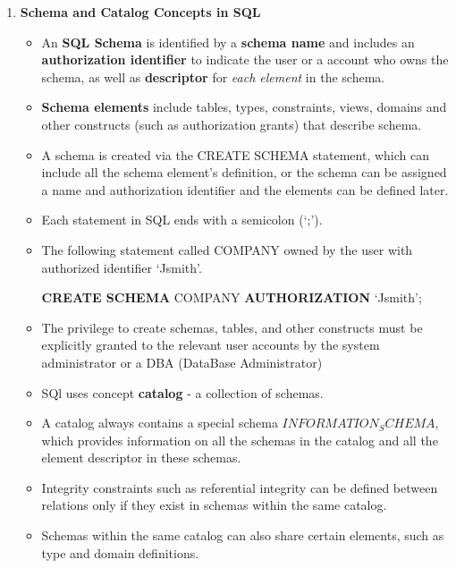 \documentclass[10pt]{article}
\begin{document}
\begin{enumerate}
	\item \textbf{Schema and Catalog Concepts in SQL}
	\begin{itemize}
		\item An \textbf{SQL Schema} is identified by a \textbf{schema name} and includes an \textbf{authorization identifier} to indicate the user or a account who owns the schema, as well as \textbf{descriptor} for \textit{each element} in the schema.
		\item \textbf{Schema elements} include tables, types, constraints, views, domains and other constructs (such as authorization grants) that describe schema.
		\item A schema is created via the CREATE SCHEMA statement, which can include all the schema element's definition, or the schema can be assigned a name and authorization identifier and the elements can be defined later.
		\item Each statement in SQL ends with a semicolon (`;').
		\item The following statement called COMPANY owned by the user with authorized identifier `Jsmith'.
		\begin{center}
			\textbf{CREATE SCHEMA} COMPANY \textbf{AUTHORIZATION} `Jsmith';
		\end{center}
		\item The privilege to create schemas, tables, and other constructs must be explicitly granted to the relevant user accounts by the system administrator or a DBA (DataBase Administrator)
		\item SQl uses concept \textbf{catalog} - a collection of schemas.
		\item A catalog always contains a special schema $INFORMATION_SCHEMA$, which provides information on all the schemas in the catalog and all the element descriptor in these schemas.
		\item Integrity constraints such as referential integrity can be defined between relations only if they exist in schemas within the same catalog.
		\item Schemas within the same catalog can also share certain elements, such as type and domain definitions.
	\end{itemize}


\end{enumerate}
\end{document}
